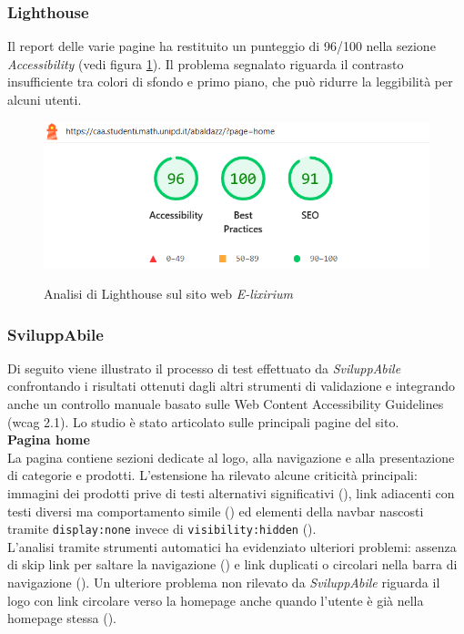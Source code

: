\subsubsection{Lighthouse}
\noindent Il report delle varie pagine ha restituito un punteggio di 96/100 nella sezione \textit{Accessibility} (vedi figura \ref{fig:Lighthouse_elixirium}). 
Il problema segnalato riguarda il contrasto insufficiente tra colori di sfondo e primo piano, che può ridurre la leggibilità per alcuni utenti. 
\begin{figure}[H]
    \centering
    \includegraphics[width=0.6\linewidth, alt={Screenshot dell'analisi di Lighthouse sul sito web E-lixirium}]{img/Lighthouse_elixirium.png}
    \caption{Analisi di Lighthouse sul sito web \textit{E-lixirium}}\label{fig:Lighthouse_elixirium}
\end{figure}

\subsubsection{SviluppAbile}
\noindent Di seguito viene illustrato il processo di test effettuato da \textit{SviluppAbile} confrontando i risultati ottenuti dagli altri strumenti di validazione e integrando anche un controllo manuale basato sulle Web Content Accessibility Guidelines (\acrshort{wcag} 2.1). Lo studio è stato articolato sulle principali pagine del sito.\\

\noindent \textbf{Pagina home}\\
La pagina contiene sezioni dedicate al logo, alla navigazione e alla presentazione di categorie e prodotti. L’estensione ha rilevato alcune criticità principali: immagini dei prodotti prive di testi alternativi significativi ({}), link adiacenti con testi diversi ma comportamento simile ({}) ed elementi della navbar nascosti tramite \texttt{display:none} invece di \texttt{visibility:hidden} ({}).\\
L’analisi tramite strumenti automatici ha evidenziato ulteriori problemi: assenza di skip link per saltare la navigazione ({}) e link duplicati o circolari nella barra di navigazione ({}). Un ulteriore problema non rilevato da \textit{SviluppAbile} riguarda il logo con link circolare verso la homepage anche quando l’utente è già nella homepage stessa ({}).\\

